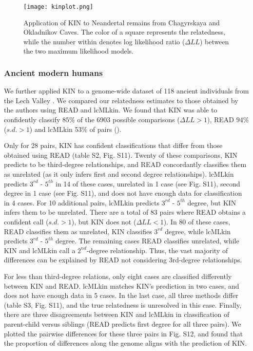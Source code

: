 \documentclass[12pt, letterpaper]{article}
\begin{document}
\begin{figure}[ht!]
    \texttt{[image: kinplot.png]}
    \centering
    \caption{Application of KIN to Neandertal remains from Chagyrskaya and Okladnikov Caves. The color of a square represents the relatedness, while the number within denotes log likelihood ratio ($\Delta LL$) between the two maximum likelihood models.}
    \label{fig5:Chagyrskaya_KIN}
\end{figure}

\subsubsection{Ancient modern humans}

We further applied KIN to a genome-wide dataset of 118 ancient individuals from the Lech Valley \cite{mittnik_kinship-based_2019}. We compared our relatedness estimates to those obtained by the authors using READ and lcMLkin. We found that KIN was able to confidently classify $85\%$ of the 6903 possible comparisons ($\Delta LL>1$), READ $94\%$ ($s.d.>1$) and lcMLkin 53\% of pairs (\cite{mittnik_kinship-based_2019}).


Only for 28 pairs, KIN has confident classifications that differ from those obtained using READ (table S2, Fig. S11). Twenty of these comparisons, KIN predicts to be third-degree relationships, and  READ concordantly classifies them as unrelated (as it only infers first and second degree relationships). lcMLkin predicts $3^{rd}$ - $5^{th}$ in 14 of these cases, unrelated in 1 case (see Fig. S11), second degree in 1 case (see Fig. S11), and does not have enough data for classification in 4 cases. For 10 additional pairs, lcMLkin predicts $3^{rd}$ - $5^{th}$ degree, but KIN infers them to be unrelated. There are a total of 83 pairs where READ obtains a confident call ($s.d.>1$), but KIN does not ($\Delta LL<1$). In 80 of these cases, READ classifies them as unrelated, KIN classifies $3^{rd}$ degree, while lcMLkin predicts $3^{rd}$ - $5^{th}$ degree. The remaining cases READ classifies unrelated, while KIN and lcMLkin call a $2^{nd}$-degree relationship. Thus, the vast majority of differences can be explained by READ not considering 3rd-degree relationships.

For less than third-degree relations, only eight cases are classified differently between KIN and READ. lcMLkin matches KIN's prediction in two cases, and does not have enough data in 5 cases. In the last case, all three methods differ (table S3, Fig. S11), and the true relatedness is unresolved in this case. Finally, there are three disagreements between KIN and lcMLkin in classification of parent-child versus siblings (READ predicts first degree for all three pairs). We plotted the pairwise differences for these three pairs in Fig. S12, and found that the proportion of differences along the genome aligns with the prediction of KIN.
\end{document}
